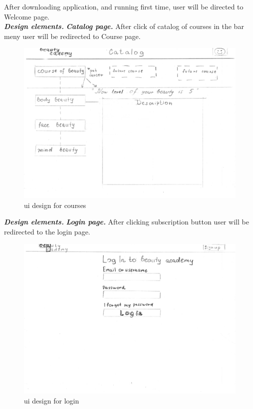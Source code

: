 \documentclass{scrartcl}
\begin{document}
After downloading application, and running first time, user will be directed to Welcome page.\\

\textbf{\textit{Design elements.}}
\textbf{\textit{Catalog page.}}
After click of catalog of courses in the bar meny user will be redirected to Course page.

\begin{figure}[H]
\centering
\includegraphics[width = 140mm]{proto-foto/ui-courses.JPG}
\caption{ui design for courses}
\label{welcome page}
\end{figure}

\textbf{\textit{Design elements.}}
\textbf{\textit{Login page. }}
After clicking subscription button user will be redirected to the login page.
\begin{figure}[H]
\centering
\includegraphics[width = 140mm]{proto-foto/ui-login.JPG}
\caption{ui design for login}
\label{login page}
\end{figure}
\end{document}

